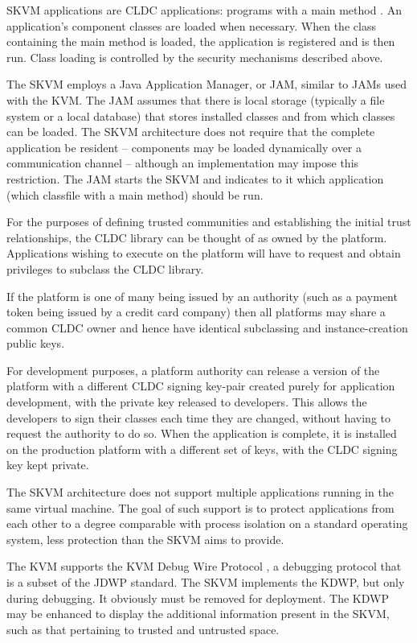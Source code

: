 \documentclass{llncs}
\begin{document}
SKVM applications are CLDC applications: programs with a main method
\cite[section 3.2]{cldc}. An application's component classes are loaded when
necessary. When the class containing the main method is loaded, the
application is registered and is then run. Class loading is controlled
by the security mechanisms described above.

The SKVM employs a Java Application Manager, or JAM, similar to JAMs
used with the KVM. The JAM assumes that there is local storage
(typically a file system or a local database) that stores installed
classes and from which classes can be loaded. The SKVM architecture does
not require that the complete application be resident -- components may
be loaded dynamically over a communication channel -- although an
implementation may impose this restriction. The JAM starts the SKVM and
indicates to it which application (which classfile with a main method)
should be run.

For the purposes of defining trusted communities and establishing the
initial trust relationships, the CLDC library can be thought of as owned
by the platform. Applications wishing to execute on the platform will
have to request and obtain privileges to subclass the CLDC library.

If the platform is one of many being issued by an authority (such as a
payment token being issued by a credit card company) then all platforms
may share a common CLDC owner and hence have identical subclassing and
instance-creation public keys.

For development purposes, a platform authority can release a version of
the platform with a different CLDC signing key-pair created purely for
application development, with the private key released to developers.
This allows the developers to sign their classes each time they are
changed, without having to request the authority to do so. When the
application is complete, it is installed on the production platform with
a different set of keys, with the CLDC signing key kept private.

The SKVM architecture does not support multiple applications running in
the same virtual machine. The goal of such support is to protect
applications from each other to a degree comparable with process
isolation on a standard operating system, less protection than the SKVM
aims to provide.

The KVM supports the KVM Debug Wire Protocol \cite{kdwp}, a debugging
protocol that is a subset of the JDWP standard. The SKVM implements the
KDWP, but only during debugging. It obviously must be removed for
deployment. The KDWP may be enhanced to display the additional
information present in the SKVM, such as that pertaining to trusted and
untrusted space.
\end{document}
